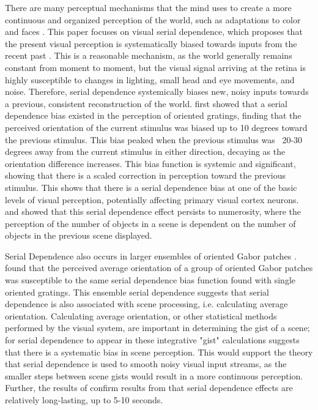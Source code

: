 \documentclass[../main.tex]{subfiles}
\begin{document}
There are many perceptual mechanisms that the mind uses to create a more continuous and organized perception of the world, such as adaptations to color \citep{webster_mollon_1997} and faces \citep{webster_macleod_2011}. This paper focuses on visual serial dependence, which proposes that the present visual perception is systematically biased towards inputs from the recent past \citep{fischer_whitney_2014, Cicchini7867}. This is a reasonable mechanism, as the world generally remains constant from moment to moment, but the visual signal arriving at the retina is highly susceptible to changes in lighting, small head and eye movements, and noise. Therefore, serial dependence systemically biases new, noisy inputs towards a previous, consistent reconstruction of the world. \cite{fischer_whitney_2014} first showed that a serial dependence bias existed in the perception of oriented gratings, finding that the perceived orientation of the current stimulus was biased up to 10 degrees toward the previous stimulus. This bias peaked when the previous stimulus was ~20-30 degrees away from the current stimulus in either direction, decaying as the orientation difference increases. This bias function is systemic and significant, showing that there is a scaled correction in perception toward the previous stimulus. This shows that there is a serial dependence bias at one of the basic levels of visual perception, potentially affecting primary visual cortex neurons. \cite{corbett} and \cite{Cicchini7867} showed that this serial dependence effect persists to numerosity, where the perception of the number of objects in a scene is dependent on the number of objects in the previous scene displayed.

Serial Dependence also occurs in larger ensembles of oriented Gabor patches \citep{Manassi}. \cite{Manassi} found that the perceived average orientation of a group of oriented Gabor patches was susceptible to the same serial dependence bias function found with single oriented gratings. This ensemble serial dependence suggests that serial dependence is also associated with scene processing, i.e. calculating average orientation. Calculating average orientation, or other statistical methods performed by the visual system, are important in determining the gist of a scene; for serial dependence to appear in these integrative "gist" calculations suggests that there is a systematic bias in scene perception. This would support the theory that serial dependence is used to smooth noisy visual input streams, as the smaller steps between scene gists would result in a more continuous perception. Further, the results of \cite{Manassi} confirm results from \cite{fischer_whitney_2014} that serial dependence effects are relatively long-lasting, up to 5-10 seconds.
\end{document}
